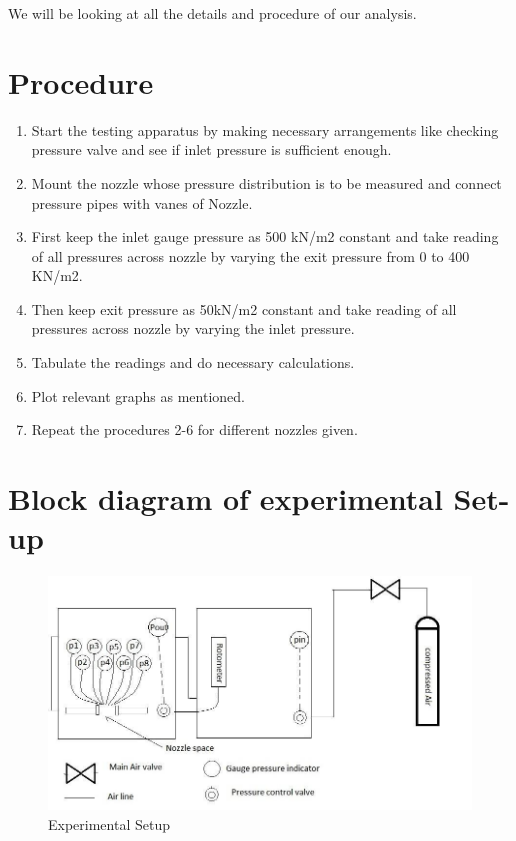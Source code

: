 We will be looking at all the details and procedure of our analysis.

\section{Procedure}
\begin{enumerate}
    \item Start the testing apparatus by making necessary arrangements like checking pressure valve and see if inlet pressure is sufficient enough.
    \item Mount the nozzle whose pressure distribution is to be measured and
connect pressure pipes with vanes of Nozzle.
    \item First keep the inlet gauge pressure as 500 kN/m2 constant and take
reading of all pressures across nozzle by varying the exit pressure from 0 to
400 KN/m2.
    \item Then keep exit pressure as 50kN/m2 constant and take reading of all
pressures across nozzle by varying the inlet pressure.
    \item Tabulate the readings and do necessary calculations.
    \item Plot relevant graphs as mentioned.
    \item Repeat the procedures 2-6 for different nozzles given.
\end{enumerate}

\newpage
\section{Block diagram of experimental Set-up}
\begin{figure}[!h]
    \centering
    \includegraphics[width=16cm]{experimental setup.jpg}
    \caption{Experimental Setup}
\end{figure}


